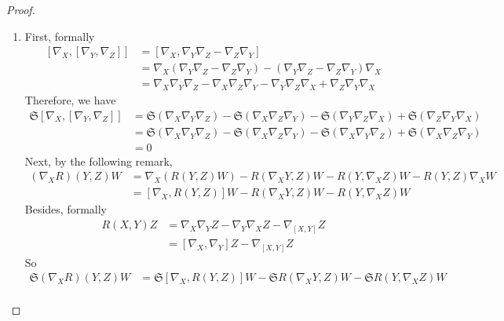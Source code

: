 \begin{enumerate}[label=\arabic{*}.]
\begin{proof}
\begin{enumerate}[label=(\arabic{*})]
			\item First, formally
			\begin{equation*}
				\begin{aligned}
					[\nabla_X,[\nabla_Y,\nabla_Z]] &= [\nabla_X,\nabla_Y\nabla_Z-\nabla_Z\nabla_Y] \\
					&= \nabla_X(\nabla_Y\nabla_Z-\nabla_Z\nabla_Y)-(\nabla_Y\nabla_Z-\nabla_Z\nabla_Y)\nabla_X\\
					&= \nabla_X\nabla_Y\nabla_Z - \nabla_X\nabla_Z\nabla_Y - \nabla_Y\nabla_Z\nabla_X + \nabla_Z\nabla_Y\nabla_X
				\end{aligned}
			\end{equation*}
			Therefore, we have
			\begin{equation*}
				\begin{aligned}
					\mathfrak{S}[\nabla_X,[\nabla_Y,\nabla_Z]] &= \mathfrak{S}(\nabla_X\nabla_Y\nabla_Z) - \mathfrak{S}(\nabla_X\nabla_Z\nabla_Y) - \mathfrak{S}(\nabla_Y\nabla_Z\nabla_X) + \mathfrak{S}(\nabla_Z\nabla_Y\nabla_X)\\
					&= \mathfrak{S}(\nabla_X\nabla_Y\nabla_Z) - \mathfrak{S}(\nabla_X\nabla_Z\nabla_Y) - \mathfrak{S}(\nabla_X\nabla_Y\nabla_Z) + \mathfrak{S}(\nabla_X\nabla_Z\nabla_Y)\\
					&=0
				\end{aligned}
			\end{equation*}
			Next, by the following remark,
			\begin{equation*}
				\begin{aligned}
					(\nabla_XR)(Y,Z)W &= \nabla_X(R(Y,Z)W) -R(\nabla_XY,Z)W -R(Y,\nabla_XZ)W-R(Y,Z)\nabla_XW\\
					&= [\nabla_X,R(Y,Z)]W-R(\nabla_XY,Z)W -R(Y,\nabla_XZ)W
				\end{aligned}
			\end{equation*}
			Besides, formally
			\begin{equation*}
				\begin{aligned}
					R(X,Y)Z &= \nabla_X\nabla_YZ - \nabla_Y\nabla_XZ -\nabla_{[X,Y]}Z \\
					&= [\nabla_X,\nabla_Y]Z - \nabla_{[X,Y]}Z
				\end{aligned}
			\end{equation*}
			So
			\begin{equation*}
				\begin{aligned}
					\mathfrak{S}(\nabla_XR)(Y,Z)W &= \mathfrak{S}[\nabla_X,R(Y,Z)]W-\mathfrak{S}R(\nabla_XY,Z)W -\mathfrak{S}R(Y,\nabla_XZ)W \\

\end{aligned}
\end{equation*}
\end{enumerate}
\end{proof}
\end{enumerate}
